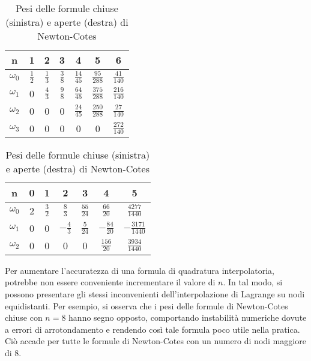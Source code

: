 \documentclass[10pt]{amsart}
\begin{document}
\begin{table}[hlr]
\begin{tabular}{|ccccccc|}
\hline
n & 1 & 2 & 3 & 4 & 5 & 6  \\
\hline
\vspace{0.5pt}$\omega_0$ & $\frac{1}{2}$ & $\frac{1}{3}$ & $\frac{3}{8}$ & $\frac{14}{45}$ & $\frac{95}{288}$ & $\frac{41}{140}$ \vspace{0.5pt}\\
\vspace{0.5pt}$\omega_1$ & 0 & $\frac{4}{3}$ & $\frac{9}{8}$ & $\frac{64}{45}$ & $\frac{375}{288}$ & $\frac{216}{140}$ \vspace{0.5pt}\\
\vspace{0.5pt}$\omega_2$ & 0 & 0 & 0 & $\frac{24}{45}$ & $\frac{250}{288}$ & $\frac{27}{140}$ \vspace{0.5pt}\\
\vspace{0.5pt}$\omega_3$ & 0 & 0 & 0 & 0 & 0 & $\frac{272}{140}$ \vspace{0.5pt}\\
\hline
\end{tabular}
\begin{tabular}{|ccccccc|}\hline
n & 0 & 1 & 2 & 3 & 4 & 5 \\
\hline
\vspace{0.5pt} $\omega_0$ & 2 & $\frac{3}{2}$ & $\frac{8}{3}$ & $\frac{55}{24}$ & $\frac{66}{20}$ & $\frac{4277}{1440}$\vspace{0.5pt}\\
\vspace{0.5pt} $\omega_1$ & 0 & 0 & $-\frac{4}{3}$ & $\frac{5}{24}$ & $-\frac{84}{20}$ & $-\frac{3171}{1440}$\vspace{0.5pt}\\
\vspace{0.5pt} $\omega_2$ & 0 & 0 & 0 & 0 & $\frac{156}{20}$ & $\frac{3934}{1440}$\vspace{0.5pt}\\
\hline
\end{tabular}
\caption{Pesi delle formule chiuse (sinistra) e aperte (destra) di Newton-Cotes\label{pesi}}
\end{table}
Per aumentare l'accuratezza di una formula di quadratura interpolatoria, potrebbe non essere conveniente incrementare il valore di $n$. In tal modo, si possono presentare gli stessi inconvenienti dell'interpolazione di Lagrange su nodi equidistanti. Per esempio, si osserva che i pesi delle formule di Newton-Cotes chiuse con $n=8$ hanno segno opposto, comportando instabilit\`a numeriche dovute a errori di arrotondamento e rendendo cos\`i tale formula poco utile nella pratica. Ci\`o accade per tutte le formule di Newton-Cotes con un numero di nodi maggiore di 8.
\end{document}
